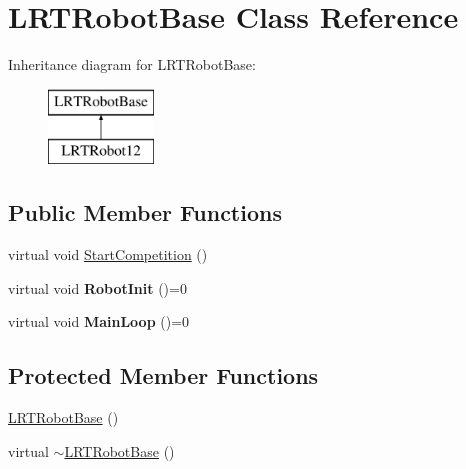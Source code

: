 \hypertarget{class_l_r_t_robot_base}{\section{\-L\-R\-T\-Robot\-Base \-Class \-Reference}
\label{class_l_r_t_robot_base}
}
\-Inheritance diagram for \-L\-R\-T\-Robot\-Base\-:\begin{figure}[H]
\begin{center}
\leavevmode
\includegraphics[height=2.000000cm]{class_l_r_t_robot_base}
\end{center}
\end{figure}
\subsection*{\-Public \-Member \-Functions}
\begin{DoxyCompactItemize}
\item 
virtual void \hyperlink{class_l_r_t_robot_base_a242e46650b04f58baaa6c3c585a15634}{\-Start\-Competition} ()
\item 
\hypertarget{class_l_r_t_robot_base_a8c1344352ad07a31cb4813433d2a30f1}{virtual void {\bfseries \-Robot\-Init} ()=0}\label{class_l_r_t_robot_base_a8c1344352ad07a31cb4813433d2a30f1}

\item 
\hypertarget{class_l_r_t_robot_base_af9508c789c4fe6248e327f0e4a853834}{virtual void {\bfseries \-Main\-Loop} ()=0}\label{class_l_r_t_robot_base_af9508c789c4fe6248e327f0e4a853834}

\end{DoxyCompactItemize}
\subsection*{\-Protected \-Member \-Functions}
\begin{DoxyCompactItemize}
\item 
\hyperlink{class_l_r_t_robot_base_a30dd1efa256483acec95edfd56435231}{\-L\-R\-T\-Robot\-Base} ()
\item 
virtual \hyperlink{class_l_r_t_robot_base_af12bef7e14e5f661b4c86f9d63158db2}{$\sim$\-L\-R\-T\-Robot\-Base} ()
\end{DoxyCompactItemize}
